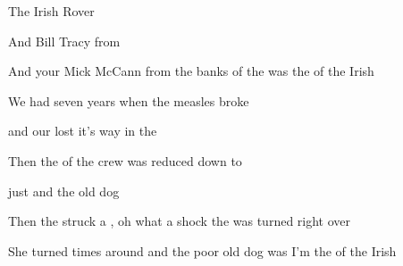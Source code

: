 \begin{SBSong}{The Irish Rover}
\begin{SBVerse}
    And  Bill Tracy from 

    And your  Mick McCann from the banks of the  \CBLineBrk\WBLineBrk
      was the  of the Irish 
  \end{SBVerse}
  \CBPageBrk
  \begin{SBVerse}
    We had  seven years when the measles broke  

    and our  lost it's way in the 

    Then the  of the crew was reduced down to 

    just  and the  old dog

    Then the  struck a , oh  what a shock the  \WBLineBrk was turned right over

    She turned  times around and the poor old dog was  \CBLineBrk\WBLineBrk
      I'm the  of the Irish 
  \end{SBVerse}
\end{SBSong}
